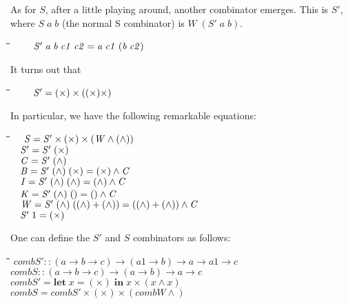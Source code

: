 \documentclass{article}
\newlength{\lwidth}\setlength{\lwidth}{4.5cm}
\newlength{\cwidth}\setlength{\cwidth}{8mm} %
\newcommand{\Conid}[1]{\mathit{#1}}
\newcommand{\Varid}[1]{\mathit{#1}}
\begin{document}
As for \ensuremath{\Conid{S}}, after a little playing around, another combinator emerges.  This is \ensuremath{\Conid{S'}},
where \ensuremath{\Conid{S}\;\Varid{a}\;\Varid{b}} (the normal S combinator) is \ensuremath{\Conid{W}\;(\Conid{S'}\;\Varid{a}\;\Varid{b})}.
\begin{tabbing}
\qquad\=\hspace{\lwidth}\=\hspace{\cwidth}\=\+\kill
${\hskip2.00em\relax\Conid{S'}\;\Varid{a}\;\Varid{b}\;\Varid{c1}\;\Varid{c2}\mathrel{=}\Varid{a}\;\Varid{c1}\;(\Varid{b}\;\Varid{c2})}$
\end{tabbing}
It turns out that
\begin{tabbing}
\qquad\=\hspace{\lwidth}\=\hspace{\cwidth}\=\+\kill
${\hskip2.00em\relax\Conid{S'}\mathrel{=}(\times)\times((\times)\times)}$
\end{tabbing}
In particular, we have the following remarkable equations:
\begin{tabbing}
\qquad\=\hspace{\lwidth}\=\hspace{\cwidth}\=\+\kill
${\hskip1.00em\relax\Conid{S}\mathrel{=}\Conid{S'}\times(\times)\times(\Conid{W}\wedge(\wedge))}$\\
${\hskip1.00em\relax\Conid{S'}\mathrel{=}\Conid{S'}\;(\times)}$\\
${\hskip1.00em\relax\Conid{C}\mathrel{=}\Conid{S'}\;(\wedge)}$\\
${\hskip1.00em\relax\Conid{B}\mathrel{=}\Conid{S'}\;(\wedge)\;(\times)\mathrel{=}(\times)\wedge\Conid{C}}$\\
${\hskip1.00em\relax\Conid{I}\mathrel{=}\Conid{S'}\;(\wedge)\;(\wedge)\mathrel{=}(\wedge)\wedge\Conid{C}}$\\
${\hskip1.00em\relax\Conid{K}\mathrel{=}\Conid{S'}\;(\wedge)\;(\!\mathop{{}^{{}^{\cdot}}}\!)\mathrel{=}(\!\mathop{{}^{{}^{\cdot}}}\!)\wedge\Conid{C}}$\\
${\hskip1.00em\relax\Conid{W}\mathrel{=}\Conid{S'}\;(\wedge)\;((\wedge)\mathbin{+}(\wedge))\mathrel{=}((\wedge)\mathbin{+}(\wedge))\wedge\Conid{C}}$\\
${\hskip1.00em\relax\Conid{S'}\;\mathrm{1}\mathrel{=}(\times)}$
\end{tabbing}
One can define the \ensuremath{\Conid{S'}} and \ensuremath{\Conid{S}} combinators as follows:
\begin{tabbing}
\qquad\=\hspace{\lwidth}\=\hspace{\cwidth}\=\+\kill
${\Varid{combS'}\mathbin{::}(\Varid{a}\to \Varid{b}\to \Varid{c})\to (\Varid{a1}\to \Varid{b})\to \Varid{a}\to \Varid{a1}\to \Varid{c}}$\\
${\Varid{combS}\mathbin{::}(\Varid{a}\to \Varid{b}\to \Varid{c})\to (\Varid{a}\to \Varid{b})\to \Varid{a}\to \Varid{c}}$\\
${\Varid{combS'}\mathrel{=}\mathbf{let}\;\Varid{x}\mathrel{=}(\times)\;\mathbf{in}\;\Varid{x}\times(\Varid{x}\wedge\Varid{x})}$\\
${\Varid{combS}\mathrel{=}\Varid{combS'}\times(\times)\times(\Varid{combW}\wedge)}$
\end{tabbing}
\end{document}
